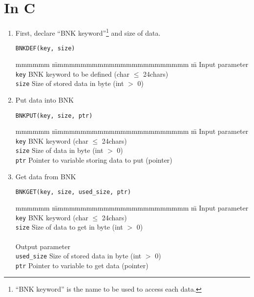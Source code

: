 \section{In C}
\begin{enumerate}
\item First, declare ``BNK keyword''\footnote{
``BNK keyword'' is the name to be used to access each data.}
and size of data.

\begin{verbatim}
BNKDEF(key, size)
\end{verbatim}
\begin{tabbing} mmmmmm \= mmmmmmmmmmmmmmmmmmmmmmmm \= m \kill
Input parameter \\
{\tt key}	\> BNK keyword to be defined	\> (char $\leq$ 24chars)\\
{\tt size}	\> Size of stored data in byte	\> (int $>$ 0)
\end {tabbing}

\item Put data into BNK

\begin{verbatim}
BNKPUT(key, size, ptr)
\end{verbatim}
\begin{tabbing} mmmmmm \= mmmmmmmmmmmmmmmmmmmmmmmm \= m \kill
Input parameter \\
{\tt key}	\> BNK keyword			\> (char $\leq$ 24chars)\\
{\tt size}	\> Size of data in byte		\> (int $>$ 0) \\
{\tt ptr}	\> Pointer to variable storing data to put	\> (pointer)
\end {tabbing}

\item Get data from BNK

\begin{verbatim}
BNKGET(key, size, used_size, ptr)
\end{verbatim}
\begin{tabbing} mmmmmm \= mmmmmmmmmmmmmmmmmmmmmmmm \= m \kill
Input parameter \\
{\tt key}	\> BNK keyword			\> (char $\leq$ 24chars)\\
{\tt size}	\> Size of data to get in byte	\> (int $>$ 0) \\
\smallskip \\
Output parameter \\
{\tt used\_size}\> Size of stored data in byte	\> (int $>$ 0) \\
{\tt ptr}	\> Pointer to variable to get data	\> (pointer)
\end {tabbing}

\end{enumerate}

